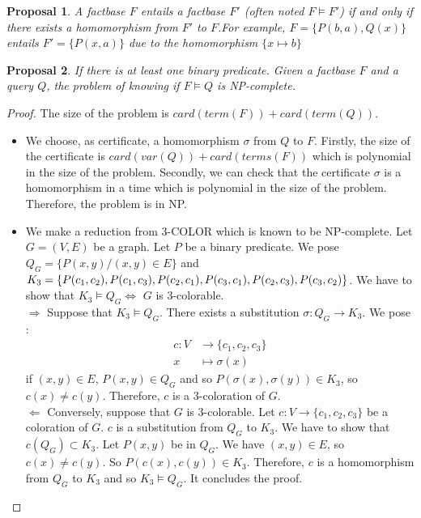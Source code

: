 \documentclass{article}
\newtheorem{proposal}{Proposal}[section]
\theoremstyle{definition}
\theoremstyle{remark}
\begin{document}
\begin{proposal}
A factbase $F$ \emph{entails} a factbase $F'$ (often noted $F \models F'$) if and only if there exists a homomorphism from $F'$ to $F$.For example, $F = \{P(b,a),Q(x)\}$ entails $F' = \{P(x,a)\}$ due to the homomorphism $\{x \mapsto b\}$ 
\end{proposal}

\begin{proposal} If there is at least one binary predicate. Given a factbase $F$ and a query $Q$, the problem of knowing if $F \models Q$ is NP-complete.
\end{proposal}

\begin{proof} The size of the problem is $card(term(F))+card(term(Q))$.
\begin{itemize}
\item We choose, as certificate, a homomorphism $\sigma$ from $Q$ to $F$. Firstly, the size of the certificate is $card(var(Q))+ card(terms(F))$ which is polynomial in the size of the problem. Secondly, we can check that the certificate $\sigma$ is a homomorphism in a time which is polynomial in the size of the problem. Therefore, the problem is in NP.  
\item We make a reduction from 3-COLOR which is known to be NP-complete. Let $G= (V,E)$ be a graph. Let $P$ be a binary predicate. We pose $Q_G = \{P(x,y)/(x,y) \in E\}$ and $K_3 = \{P(c_1,c_2),P(c_1,c_3), P(c_2,c_1),P(c_3,c_1),\\P(c_2,c_3),P(c_3,c_2)\}$. We have to show that $K_3 \models Q_G \Leftrightarrow$ $G$ is 3-colorable. \\
$\boxed{\Rightarrow}$ Suppose that $K_3 \models Q_G$. There exists a substitution $\sigma:Q_G \to K_3$. We pose : 
\begin{align*}
c:V &\to \{c_1,c_2,c_3\}\\
x &\mapsto \sigma(x)
\end{align*}
if $(x,y) \in E$, $P(x,y) \in Q_G$ and so $P(\sigma(x),\sigma(y)) \in K_3$, so $c(x) \neq c(y)$. Therefore, $c$ is a 3-coloration of $G$. \\
$\boxed{\Leftarrow}$ Conversely, suppose that $G$ is 3-colorable. Let $c:V \to \{c_1,c_2,c_3\}$ be a coloration of $G$. $c$ is a substitution from $Q_G$ to $K_3$. We have to show that $c(Q_G) \subset K_3$. Let $P(x,y)$ be in $Q_G$. We have $(x,y) \in E$, so $c(x) \neq c(y)$. So $P(c(x),c(y)) \in K_3$. Therefore, $c$ is a homomorphism from $Q_G$ to $K_3$ and so $K_3 \models Q_G$. It concludes the proof.
\end{itemize}
\end{proof}
\end{document}
